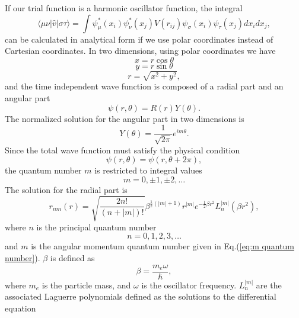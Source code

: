 \documentclass[../main.tex]{subfiles}
\begin{document}
If our trial function is a harmonic oscillator function, the integral
\begin{equation}
    \langle \mu \nu \vert \hat{v} \vert \sigma \tau \rangle = \int \psi_\mu^*(x_i) \psi_\nu^*(x_j) V(r_{ij}) \psi_\sigma(x_i) \psi_\tau(x_j) dx_i dx_j,
\end{equation}
can be calculated in analytical form if we use polar coordinates instead of Cartesian coordinates. In two dimensions, using polar coordinates we have
\begin{equation}
    x = r\cos\theta
\end{equation}
\begin{equation}
    y = r\sin\theta
\end{equation}
\begin{equation}
    r = \sqrt{x^2 + y^2},
\end{equation}
and the time independent wave function is composed of a radial part and an angular part
\begin{equation}
    \psi(r, \theta) = R(r)Y(\theta).
\end{equation}
The normalized solution for the angular part in two dimensions is
\begin{equation}
    Y(\theta) = \frac{1}{\sqrt{2\pi}}e^{im\theta}.
\end{equation}
Since the total wave function must satisfy the physical condition
\begin{equation}
    \psi(r, \theta) = \psi(r, \theta + 2\pi),
\end{equation}
the quantum number $m$ is restricted to integral values
\begin{equation}\label{eq:m quantum number}
    m = 0, \pm 1, \pm 2, \dots
\end{equation}
The solution for the radial part is
\begin{equation}
    r_{nm}(r) = \sqrt{\frac{2n!}{(n+|m|)!}} \beta^{\frac{1}{2}(|m|+1)} r^{|m|} e^{-\frac{1}{2} \beta r^2} L_n^{|m|}(\beta r^2),
\end{equation}
where $n$ is the principal quantum number
\begin{equation}
    n = 0, 1, 2, 3, \dots
\end{equation}
and $m$ is the angular momentum quantum number given in Eq.(\ref{eq:m quantum number}). $\beta$ is defined as 
\begin{equation}
    \beta = \frac{m_e \omega}{\hbar},
\end{equation}
where $m_e$ is the particle mass, and $\omega$ is the oscillator frequency. $L_n^{|m|}$ are the associated Laguerre polynomials defined as the solutions to the differential equation
\end{document}
